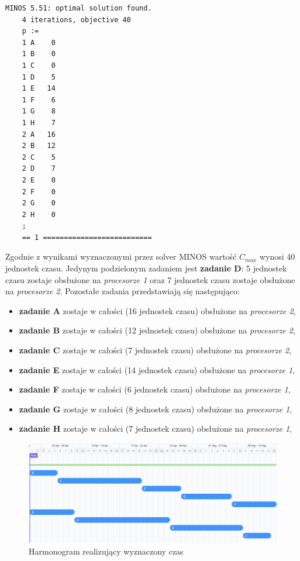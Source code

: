 \documentclass[
    12pt, %
]{../fphw}
\begin{document}
\begin{lstlisting}[caption=Rozwiązanie znalezione solwerem minos]
    MINOS 5.51: optimal solution found.
    4 iterations, objective 40
    p :=
    1 A    0
    1 B    0
    1 C    0
    1 D    5
    1 E   14
    1 F    6
    1 G    8
    1 H    7
    2 A   16
    2 B   12
    2 C    5
    2 D    7
    2 E    0
    2 F    0
    2 G    0
    2 H    0
    ;
    == 1 ==========================
\end{lstlisting}
Zgodnie z wynikami wyznaczonymi przez solver MINOS wartość \(C_{max}\) wynosi 40 jednostek czasu.
Jedynym podzielonym zadaniem jest \textbf{zadanie D}: 5 jednostek czasu zostaje obsłużone na \textit{procesorze 1}
oraz 7 jednostek czasu zostaje obsłużone na \textit{procesorze 2}.
Pozostałe zadania przedstawiają się następująco:
\begin{itemize}
    \item \textbf{zadanie A} zostaje w całości (16 jednostek czasu) obsłużone na \textit{procesorze 2},
    \item \textbf{zadanie B} zostaje w całości (12 jednostek czasu) obsłużone na \textit{procesorze 2},
    \item \textbf{zadanie C} zostaje w całości (7 jednostek czasu) obsłużone na \textit{procesorze 2},
    \item \textbf{zadanie E} zostaje w całości (14 jednostek czasu) obsłużone na \textit{procesorze 1},
    \item \textbf{zadanie F} zostaje w całości (6 jednostek czasu) obsłużone na \textit{procesorze 1},
    \item \textbf{zadanie G} zostaje w całości (8 jednostek czasu) obsłużone na \textit{procesorze 1},
    \item \textbf{zadanie H} zostaje w całości (7 jednostek czasu) obsłużone na \textit{procesorze 1},
\end{itemize}


\begin{figure}[H]
    \centering
    \includegraphics[width=\linewidth]{./img/harmonogram-1.PNG}
    \caption{Harmonogram realizujący wyznaczony czas}
    \label{fig:harmonogram-1}
\end{figure}
\end{document}
